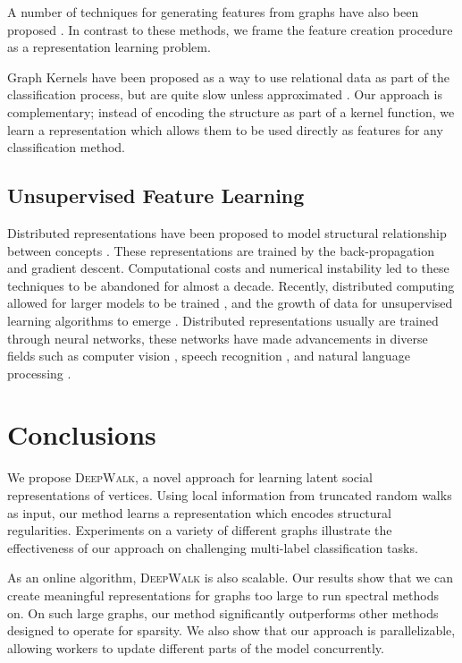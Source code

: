 \documentclass{sig-alternate}
\newcommand{\ouralgorithm}{\textsc{DeepWalk}}
\begin{document}
A number of techniques for generating features from graphs have also been proposed \cite{gallagher2010leveraging,Tang:2009:RLV:1557019.1557109,tang2009scalable,Tang:2011:Leveraging,Henderson:2011:YKG:2020408.2020512}.
In contrast to these methods, we frame the feature creation procedure as a representation learning problem.

Graph Kernels \cite{vishwanathan2010graph} have been proposed as a way to use relational data as part of the classification process, but are quite slow unless approximated \cite{kang2012fast}.  
Our approach is complementary;  instead of encoding the structure as part of a kernel function, we learn a representation which allows them to be used directly as features for any classification method.

\subsection{Unsupervised Feature Learning}
Distributed representations have been proposed to model structural relationship between concepts \cite{distributed}.
These representations are trained by the back-propagation and gradient descent.
Computational costs and numerical instability led to these techniques to be abandoned for almost a decade.
Recently, distributed computing allowed for larger models to be trained \cite{nnlm}, and the growth of data for unsupervised learning algorithms to emerge \cite{erhanhelps}.
Distributed representations usually are trained through neural networks, these networks have made advancements in diverse fields such as computer vision \cite{vision1}, speech recognition \cite{speech1}, and natural language processing \cite{senna1}.


\section{Conclusions}
\label{sec:conclusion}
We propose \ouralgorithm, a novel approach for learning latent social representations of vertices. 
Using local information from truncated random walks as input, our method learns a representation which encodes structural regularities.
Experiments on a variety of different graphs illustrate the effectiveness of our approach on challenging multi-label classification tasks.

As an online algorithm, \ouralgorithm\textsc{} is also scalable. Our results show that we can create meaningful representations for graphs too large to run spectral methods on.
On such large graphs, our method significantly outperforms other methods designed to operate for sparsity.
We also show that our approach is parallelizable, allowing workers to update different parts of the model concurrently.
\end{document}
